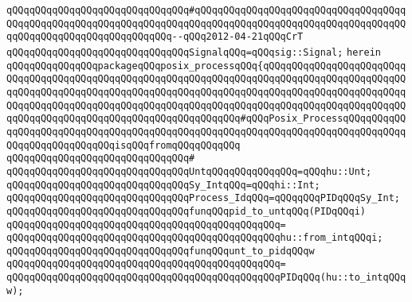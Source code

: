 \verb|qQQqqQQqqQQqqQQqqQQqqQQqqQQqqQQq#qQQqqQQqqQQqqQQqqQQqqQQqqQQqqQQqqQQqqQQqqQQqqQQqqQQqqQQqqQQqqQQqqQQqqQQqqQQqqQQqqQQqqQQqqQQqqQQqqQQqqQQqqQQqqQQqqQQqqQQqqQQqqQQqqQQqqQQq--qQQq2012-04-21qQQqCrT|\newline
\newline
\verb|qQQqqQQqqQQqqQQqqQQqqQQqqQQqqQQqSignalqQQq=qQQqsig::Signal;|\newline
\newline
\verb|herein|\newline
\newline
\verb|qQQqqQQqqQQqqQQqpackageqQQqposix_processqQQq{qQQqqQQqqQQqqQQqqQQqqQQqqQQqqQQqqQQqqQQqqQQqqQQqqQQqqQQqqQQqqQQqqQQqqQQqqQQqqQQqqQQqqQQqqQQqqQQqqQQqqQQqqQQqqQQqqQQqqQQqqQQqqQQqqQQqqQQqqQQqqQQqqQQqqQQqqQQqqQQqqQQqqQQqqQQqqQQqqQQqqQQqqQQqqQQqqQQqqQQqqQQqqQQqqQQqqQQqqQQqqQQqqQQqqQQqqQQqqQQqqQQqqQQqqQQqqQQqqQQqqQQqqQQqqQQqqQQq#qQQqPosix_ProcessqQQqqQQqqQQqqQQqqQQqqQQqqQQqqQQqqQQqqQQqqQQqqQQqqQQqqQQqqQQqqQQqqQQqqQQqqQQqqQQqqQQqqQQqqQQqqQQqqQQqisqQQqfromqQQqqQQqqQQq|\newline
\verb|qQQqqQQqqQQqqQQqqQQqqQQqqQQqqQQq#|\newline
\verb|qQQqqQQqqQQqqQQqqQQqqQQqqQQqqQQqUntqQQqqQQqqQQqqQQq=qQQqhu::Unt;|\newline
\verb|qQQqqQQqqQQqqQQqqQQqqQQqqQQqqQQqSy_IntqQQq=qQQqhi::Int;|\newline
\newline
\verb|qQQqqQQqqQQqqQQqqQQqqQQqqQQqqQQqProcess_IdqQQq=qQQqqQQqPIDqQQqSy_Int;|\newline
\newline
\newline
\verb|qQQqqQQqqQQqqQQqqQQqqQQqqQQqqQQqfunqQQqpid_to_untqQQq(PIDqQQqi)|\newline
\verb|qQQqqQQqqQQqqQQqqQQqqQQqqQQqqQQqqQQqqQQqqQQqqQQq=|\newline
\verb|qQQqqQQqqQQqqQQqqQQqqQQqqQQqqQQqqQQqqQQqqQQqqQQqhu::from_intqQQqi;|\newline
\newline
\newline
\verb|qQQqqQQqqQQqqQQqqQQqqQQqqQQqqQQqfunqQQqunt_to_pidqQQqw|\newline
\verb|qQQqqQQqqQQqqQQqqQQqqQQqqQQqqQQqqQQqqQQqqQQqqQQq=|\newline
\verb|qQQqqQQqqQQqqQQqqQQqqQQqqQQqqQQqqQQqqQQqqQQqqQQqPIDqQQq(hu::to_intqQQqw);|\newline
\newline
